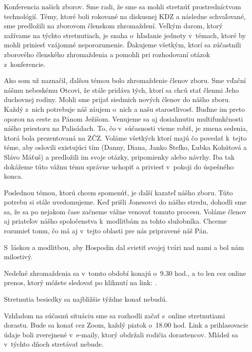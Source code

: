 Konferencia našich zborov. Sme radi, že sme sa mohli stretnúť prostredníctvom technológií. Témy, ktoré boli rokované na diskusnej KDZ a následne schvaľované, sme predložili na zborovom členskom zhromaždení. Veľkým darom, ktorý zažívame na týchto stretnutiach, je snaha o~hľadanie jednoty v~témach, ktoré by mohli priniesť vzájomné neporozumenie. Ďakujeme všetkým, ktorí sa zúčastnili zborového členského zhromaždenia a pomohli pri rozhodovaní otázok z~konferencie.

Ako som už naznačil, ďalšou témou bolo zhromaždenie členov zboru. Sme vďační nášmu nebeskému Otcovi, že stále pridáva tých, ktorí sa chcú stať členmi Jeho duchovnej rodiny. Mohli sme prijať siedmich nových členov do nášho zboru. Každý z~nich potrebuje náš záujem o~nich a našu starostlivosť. Buďme im preto oporou na ceste za Pánom Ježišom.
Venujeme sa aj dosiahnutiu multifunkčnosti nášho priestoru na Palisádach. To, čo v~súčasnosti vieme robiť, je zmena sedenia, ktorá bola prezentovaná na ZČZ. Voláme všetkých ktorí majú čo povedať k~tejto téme, aby oslovili existujúci tím (Danny, Diana, Janko Štefko, Ľubka Kohútová a Slávo Máťuš) a predložili im svoje otázky, pripomienky alebo návrhy. Iba tak dokážeme túto vážnu tému správne uchopiť a priviesť v~pokoji do úspešného konca.

Poslednou témou, ktorú chcem spomenúť, je ďalší kazateľ nášho zboru. Túto potrebu si stále uvedomujeme. Keď prišli Jonesovci do nášho stredu, dohodli sme sa, že sa po nejakom čase začneme vážne venovať tomuto procesu. Voláme členov aj priateľov nášho spoločenstva k~modlitbám za tohto služobníka. Chceme rozumieť tomu, čo má aj v~tejto oblasti pre nás pripravené náš Pán.

S~láskou a modlitbou, aby Hospodin dal svietiť svojej tvári nad nami a bol nám milostivý.



Nedeľné zhromaždenia sa v~tomto období konajú o~9.30 hod., a to len cez online prenos, ktorý môžete sledovať po kliknutí na link: .

Stretnutia besiedky sa najbližšie týždne konať nebudú.

Vzhľadom na súčasnú situáciu sme sa rozhodli začať s~online stretnutiami dorastu.
Bude sa konať cez Zoom, každý piatok o~18.00 hod. Link a prihlasovacie údaje boli zverejnené v~e-maily, ktorý obdržali rodičia dorastencov.
Mládež sa v~týchto dňoch stretávať nebude.



